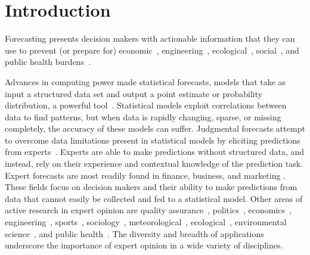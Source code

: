 \documentclass[preprint,authoryear,nonatbib]{elsarticle}
\begin{document}
\section{Introduction}

Forecasting presents decision makers with actionable information that they can use to prevent (or prepare for) economic~\parencite{shin2013robust,huang2016improving,mak1996aggregating}, engineering~\parencite{guangliang1996multi,zio1996use,neves2008life}, ecological~\parencite{borsuk2004predictive,failing2004using,morales2017characterization,johnson2018making}, social~\parencite{cabello2012combination,klas2010support,craig2001bayesian}, and public health burdens~\parencite{evans1994use,alho1992estimating}.


Advances in computing power made statistical forecasts, models that take as input a structured data set and output a point estimate or probability distribution, a powerful tool~\parencite{wang2016statistical,kune2016anatomy,al2015efficient}. 
Statistical models exploit correlations between data to find patterns, but when data is rapidly changing, sparse, or missing completely, the accuracy of these models can suffer. 
Judgmental forecasts attempt to overcome data limitations present in statistical models by eliciting predictions from experts~\parencite{clemen1986combining,clemen1989combining,genest1986combining}.
Experts are able to make predictions without structured data, and instead, rely on their experience and contextual knowledge of the prediction task.
Expert forecasts are most readily found in finance, business, and marketing \parencite{shin2013robust,seifert2013relative,franses2011averaging,petrovic2006fuzzy,alvarado2017expertise,song2013combining,baecke2017investigating,baecke2017investigating,petrovic2006fuzzy,franses2011averaging,song2013combining,alvarado2017expertise,seifert2013relative,kabak2008aggregating}.
These fields focus on decision makers and their ability to make predictions from data that cannot easily be collected and fed to a statistical model.
Other areas of active research in expert opinion are quality assurance~\parencite{klas2010support}, politics~\parencite{hanea2018value,graefe2014accuracy,graefe2015accuracy,graefe2018predicting,cai2016simple,wang2018bayesian,satopaa2014probability,graefe2014combining}, economics~\parencite{shin2013robust,huang2016improving,mak1996aggregating}, engineering~\parencite{craig2001bayesian,tartakovsky2007probabilistic,neves2008life,ZIO1996127,brito2016bayesian,jin2007research,wang2008probabilistic,brito2012behavioral,hathout2016uncertainty,ren2002optimal}, sports~\parencite{gu2016expert}, sociology~\parencite{cabello2012combination,adams2009acceptability}, meteorological~\parencite{abramson1996hailfinder}, ecological~\parencite{johnson2018making,borsuk2004predictive,failing2004using,cooke2014out}, environmental science~\parencite{morales2017characterization,mantyka2014understanding,li2012preliminary,zio1997accounting}, and public health~\parencite{alho1992estimating,EVANS199415,jana2019interval,kurowicka2010probabilistic}.
The diversity and breadth of applications underscore the importance of expert opinion in a wide variety of disciplines.
\end{document}
